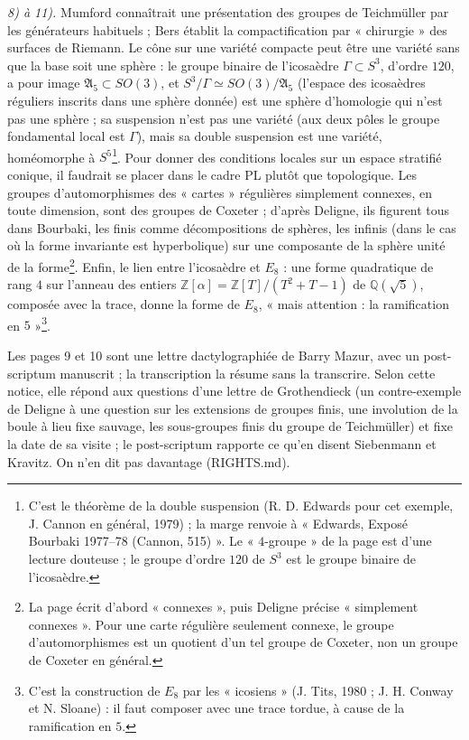 \documentclass[11pt,a4paper]{article}
\begin{document}
\emph{8) à 11).} Mumford connaîtrait une présentation des groupes de
Teichmüller par les générateurs habituels ; Bers établit la compactification
par « chirurgie » des surfaces de Riemann. Le cône sur une variété compacte
peut être une variété sans que la base soit une sphère : le groupe binaire
de l'icosaèdre $\Gamma \subset S^3$, d'ordre $120$, a pour image
$\mathfrak{A}_5 \subset SO(3)$, et $S^3/\Gamma \simeq SO(3)/\mathfrak{A}_5$
(l'espace des icosaèdres réguliers inscrits dans une sphère donnée) est une
sphère d'homologie qui n'est pas une sphère ; sa suspension n'est pas une
variété (aux deux pôles le groupe fondamental local est $\Gamma$), mais sa
double suspension est une variété, homéomorphe à $S^5$\footnote{C'est le
théorème de la double suspension (R. D. Edwards pour cet exemple, J. Cannon
en général, 1979) ; la marge renvoie à « Edwards, Exposé Bourbaki 1977--78
(Cannon, 515) ». Le « $4$-groupe » de la page est d'une lecture douteuse ; le
groupe d'ordre $120$ de $S^3$ est le groupe binaire de l'icosaèdre.}. Pour
donner des conditions locales sur un espace stratifié conique, il faudrait se
placer dans le cadre PL plutôt que topologique. Les groupes d'automorphismes
des « cartes » régulières simplement connexes, en toute dimension, sont des
groupes de Coxeter ; d'après Deligne, ils figurent tous dans Bourbaki, les
finis comme décompositions de sphères, les infinis (dans le cas où la forme
invariante est hyperbolique) sur une composante de la sphère unité de la
forme\footnote{La page écrit d'abord « connexes », puis Deligne précise
« simplement connexes ». Pour une carte régulière seulement connexe, le groupe
d'automorphismes est un quotient d'un tel groupe de Coxeter, non un groupe de
Coxeter en général.}. Enfin, le lien entre l'icosaèdre et $E_8$ : une forme
quadratique de rang $4$ sur l'anneau des entiers
$\mathbb{Z}[\alpha] = \mathbb{Z}[T]/(T^2 + T - 1)$ de $\mathbb{Q}(\sqrt{5})$,
composée avec la trace, donne la forme de $E_8$, « mais attention : la
ramification en $5$ »\footnote{C'est la construction de $E_8$ par les
« icosiens » (J. Tits, 1980 ; J. H. Conway et N. Sloane) : il faut composer avec
une trace tordue, à cause de la ramification en $5$.}.

Les pages 9 et 10 sont une lettre dactylographiée de Barry Mazur, avec un
post-scriptum manuscrit ; la transcription la résume sans la transcrire. Selon
cette notice, elle répond aux questions d'une lettre de Grothendieck (un
contre-exemple de Deligne à une question sur les extensions de groupes finis,
une involution de la boule à lieu fixe sauvage, les sous-groupes finis du
groupe de Teichmüller) et fixe la date de sa visite ; le post-scriptum
rapporte ce qu'en disent Siebenmann et Kravitz. On n'en dit pas davantage
(RIGHTS.md).
\end{document}
